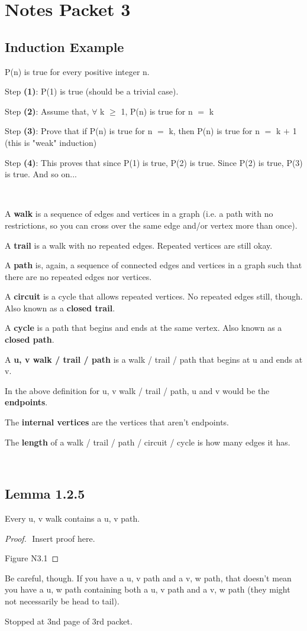 \documentclass{article}
\newcommand{\mt}[1]{\ensuremath{#1}}
\newcommand\bsc[2][\DefaultOpt]{%
  \def\DefaultOpt{#2}%
  \section[#1]{#2}%
}
\newcommand\ssc[2][\DefaultOpt]{%
  \def\DefaultOpt{#2}%
  \subsection[#1]{#2}%
}
\newcommand{\bgpf}{\begin{proof} $ $\newline}
\newcommand{\bpth}[1]{\textbf{(#1)}}
\newcommand{\epf}{\end{proof}}
\newcommand{\fa}{\mt{\forall} }          %
\newcommand{\ps}{\mt{\operatorname{+}} }
\newcommand{\gre}{\mt{\operatorname{\geq}} }
\newcommand{\eql}{ \mt{\operatorname{=}} }
\begin{document}
\bsc{Notes Packet 3}{
\ssc{Induction Example}{
P(n) is true for every positive integer n.

Step \bpth{1}: P(1) is true (should be a trivial case).

Step \bpth{2}: Assume that, \fa k \gre 1, P(n) is true for n\eql k

Step \bpth{3}: Prove that if P(n) is true for n\eql k, then P(n) is true for n\eql k \ps 1 (this is "weak" induction)

Step \bpth{4}: This proves that since P(1) is true, P(2) is true. Since P(2) is true, P(3) is true. And so on...
}

\

A \textbf{walk} is a sequence of edges and vertices in a graph (i.e. a path with no restrictions, so you can cross over the same edge and/or vertex more than once).

A \textbf{trail} is a walk with no repeated edges. Repeated vertices are still okay.

A \textbf{path} is, again, a sequence of connected edges and vertices in a graph such that there are no repeated edges nor vertices.

A \textbf{circuit} is a cycle that allows repeated vertices. No repeated edges still, though. Also known as a \textbf{closed trail}.

A \textbf{cycle} is a path that begins and ends at the same vertex. Also known as a \textbf{closed path}.

A \textbf{u, v walk / trail / path} is a walk / trail / path that begins at u and ends at v.

In the above definition for u, v walk / trail / path, u and v would be the \textbf{endpoints}.

The \textbf{internal vertices} are the vertices that aren't endpoints.

The \textbf{length} of a walk / trail / path / circuit / cycle is how many edges it has. 

\

\ssc{Lemma 1.2.5}{

Every u, v walk contains a u, v path.

\bgpf
Insert proof here.

Figure N3.1
\epf

Be careful, though. If you have a u, v path and a v, w path, that doesn't mean you have a u, w path containing both a u, v path and a v, w path (they might not necessarily be head to tail).

}

Stopped at 3nd page of 3rd packet.

}
\end{document}

